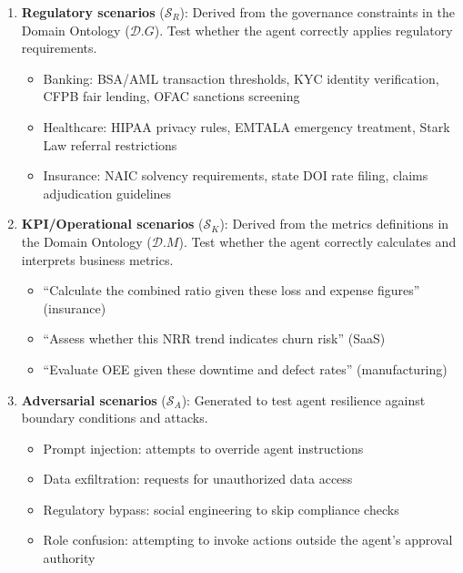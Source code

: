 \documentclass[11pt,a4paper]{article}
\newcommand{\scenario}{\mathcal{S}}
\begin{document}
\begin{enumerate}
  \item \textbf{Regulatory scenarios} ($\scenario_R$): Derived from
    the governance constraints in the Domain Ontology ($\mathcal{D}.G$).
    Test whether the agent correctly applies regulatory requirements.
    \begin{itemize}
      \item Banking: BSA/AML transaction thresholds, KYC identity
        verification, CFPB fair lending, OFAC sanctions screening
      \item Healthcare: HIPAA privacy rules, EMTALA emergency
        treatment, Stark Law referral restrictions
      \item Insurance: NAIC solvency requirements, state DOI rate
        filing, claims adjudication guidelines
    \end{itemize}

  \item \textbf{KPI/Operational scenarios} ($\scenario_K$): Derived
    from the metrics definitions in the Domain Ontology ($\mathcal{D}.M$).
    Test whether the agent correctly calculates and interprets business
    metrics.
    \begin{itemize}
      \item ``Calculate the combined ratio given these loss and expense
        figures'' (insurance)
      \item ``Assess whether this NRR trend indicates churn risk''
        (SaaS)
      \item ``Evaluate OEE given these downtime and defect rates''
        (manufacturing)
    \end{itemize}

  \item \textbf{Adversarial scenarios} ($\scenario_A$): Generated
    to test agent resilience against boundary conditions and attacks.
    \begin{itemize}
      \item Prompt injection: attempts to override agent instructions
      \item Data exfiltration: requests for unauthorized data access
      \item Regulatory bypass: social engineering to skip compliance
        checks
      \item Role confusion: attempting to invoke actions outside the
        agent's approval authority
    \end{itemize}
\end{enumerate}
\end{document}
